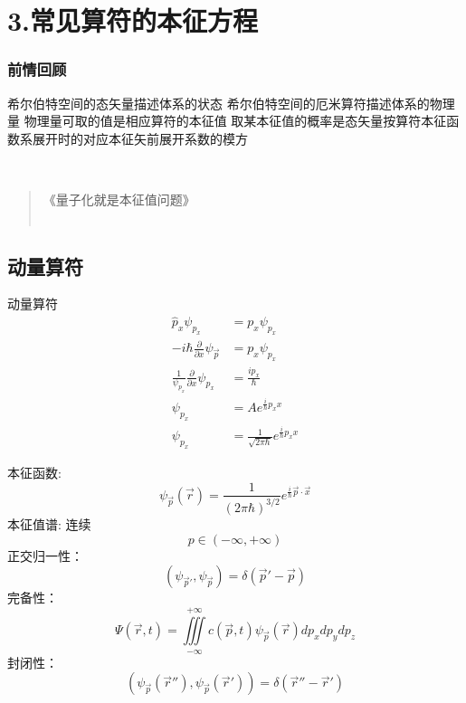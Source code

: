 \section{3.常见算符的本征方程}

\begin{frame}
    \frametitle{前情回顾}
    \begin{itemize}
        \Item 希尔伯特空间的态矢量描述体系的状态
        \Item 希尔伯特空间的厄米算符描述体系的物理量
        \Item 物理量可取的值是相应算符的本征值
        \Item 取某本征值的概率是态矢量按算符本征函数系展开时的对应本征矢前展开系数的模方
    \end{itemize} 
    ~~ \\ \vspace{0.8em}
    \begin{quote}
     《量子化就是本征值问题》\\
     ~~\\
    \end{quote}
\end{frame} 


\subsection{动量算符}

\begin{frame} {动量算符}
    \例[1.求解动量算符本征方程]{  
    \[\hat{\vec p}\psi_{\vec p}=\vec p \psi_{\vec p}\] }  
    \解~  
    \begin{equation*}
        \begin{split}
            \hat{p}_x\psi_{p_x}&=p_x \psi_{p_x} \\
            -i\hbar\frac{\partial}{\partial x} \psi_{\vec p} &= p_x \psi_{p_x}\\
            \frac{1}{\psi_{p_{x}}} \frac{\partial}{\partial x} \psi_{p_{x}}&=\frac{i p_{x}}{\hbar}\\
            \psi_{p_{x}}&=Ae^{\frac{i}{\hbar}p_x x} \\
            \psi_{p_{x}}&=\frac{1}{\sqrt{2\pi\hbar}}e^{\frac{i}{\hbar}p_x x}
        \end{split} 
    \end{equation*}
\end{frame} 

\begin{frame} 
    本征函数: $$ \psi_{\vec{p}}(\vec{r})=\frac{1}{(2\pi\hbar)^{3/2}}e^{\frac{i}{\hbar}\vec{p}\cdot \vec{x}}   $$
    本征值谱: 连续
        $$ p \in (-\infty, +\infty) $$
    正交归一性：
        $$ (\psi_{\vec{p}'}, \psi_{\vec{p}}) =\delta(\vec{p}'-\vec{p})$$
    完备性：
    $$ \Psi(\vec{r},t)=\iiint\limits_{-\infty}^{+\infty}c(\vec{p},t) \psi_{\vec{p}}(\vec{r}) dp_xdp_ydp_z $$
    封闭性：$$ (\psi_{\vec{p}}(\vec{r}''), \psi_{\vec{p}}(\vec{r}')) =\delta(\vec{r}''-\vec{r}')$$
\end{frame} 


